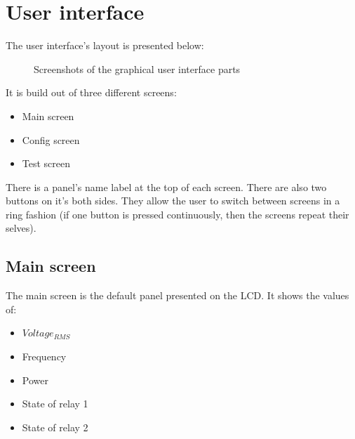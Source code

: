 \section{User interface}
The user interface's layout is presented below:\\
\begin{figure}[!h]
  \centering
         
  \caption{Screenshots of the graphical user interface parts}
  \label{fig:filter}
\end{figure}
It is build out of three different screens:
\begin{itemize}
\item Main screen
\item Config screen
\item Test screen
\end{itemize}
There is a panel's name label at the top of each screen. There are also two buttons on it's both sides. They allow the user to switch between screens in a ring fashion (if one button is pressed continuously, then the screens repeat their selves).\\

\subsection{Main screen}
The main screen is the default panel presented on the LCD. It shows the values of:
\begin{itemize}
\item $ Voltage_{RMS} $
\item Frequency
\item Power
\item State of relay 1
\item State of relay 2
\end{itemize}
